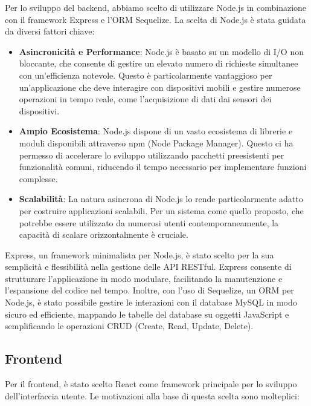 \documentclass[twoside]{supsistudent}
\begin{document}
Per lo sviluppo del backend, abbiamo scelto di utilizzare Node.js in combinazione con il framework Express e l'ORM Sequelize. La scelta di Node.js è stata guidata da diversi fattori chiave:

\begin{itemize}
  \item \textbf{Asincronicità e Performance}: Node.js è basato su un modello di I/O non bloccante, che consente di gestire un elevato numero di richieste simultanee con un'efficienza notevole. Questo è particolarmente vantaggioso per un'applicazione che deve interagire con dispositivi mobili e gestire numerose operazioni in tempo reale, come l'acquisizione di dati dai sensori dei dispositivi.
  \item \textbf{Ampio Ecosistema}: Node.js dispone di un vasto ecosistema di librerie e moduli disponibili attraverso npm (Node Package Manager). Questo ci ha permesso di accelerare lo sviluppo utilizzando pacchetti preesistenti per funzionalità comuni, riducendo il tempo necessario per implementare funzioni complesse.
  \item \textbf{Scalabilità}: La natura asincrona di Node.js lo rende particolarmente adatto per costruire applicazioni scalabili. Per un sistema come quello proposto, che potrebbe essere utilizzato da numerosi utenti contemporaneamente, la capacità di scalare orizzontalmente è cruciale.
\end{itemize}

Express, un framework minimalista per Node.js, è stato scelto per la sua semplicità e flessibilità nella gestione delle API RESTful. Express consente di strutturare l'applicazione in modo modulare, facilitando la manutenzione e l'espansione del codice nel tempo. Inoltre, con l'uso di Sequelize, un ORM per Node.js, è stato possibile gestire le interazioni con il database MySQL in modo sicuro ed efficiente, mappando le tabelle del database su oggetti JavaScript e semplificando le operazioni CRUD (Create, Read, Update, Delete).

\subsection{Frontend}

Per il frontend, è stato scelto React come framework principale per lo sviluppo dell'interfaccia utente. Le motivazioni alla base di questa scelta sono molteplici:
\end{document}
